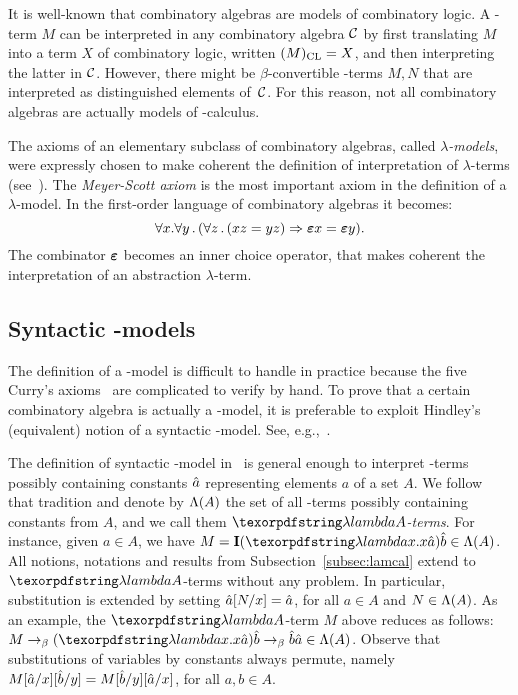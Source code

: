 It is well-known that combinatory algebras are models of combinatory logic. A \lam-term $M$ can be interpreted in any combinatory algebra $\cC$ by first translating $M$ into a term $X$ of combinatory logic, written $(M)_\CL = X$, and then interpreting the latter in $\cC$. However, there might be $\beta$-convertible \lam-terms $M,N$ that are interpreted as distinguished elements of~$\cC$. For this reason, not all combinatory algebras are actually models of \lam-calculus.

The axioms of an elementary subclass of combinatory algebras, called \emph{$\lambda$-models}, were expressly chosen to make coherent the definition of interpretation of $\lambda$-terms (see~\cite[Def.~5.2.1]{Bare}).
The \emph{Meyer-Scott axiom} is the most important axiom in the definition of a $\lambda$-model.
In the first-order language of combinatory algebras it becomes:
\[
\forall x. \forall y\,.\,(\forall z\,.\, (xz = yz) \Rightarrow \sso x = \sso y).
\]
The combinator $\sso$ becomes an inner choice operator, that makes coherent the interpretation of an abstraction $\lambda$-term.

\subsection{Syntactic \lam-models}

The definition of a \lam-model is difficult to handle in practice because the five Curry's axioms~\cite[Thm.~5.2.5]{Bare} are complicated to verify by hand.
To prove that a certain combinatory algebra is actually a \lam-model, it is preferable to exploit Hindley's (equivalent) notion of a syntactic \lam-model. See, e.g.,~\cite{Koymans82}.

The definition of syntactic \lam-model in~\cite{Koymans82} is general enough to interpret \lam-terms possibly containing constants $\cons{a}$ representing elements $a$ of a set $A$.
We follow that tradition and denote by $\Lam(A)$ the set of all \lam-terms possibly containing constants from $A$, and we call them \emph{$\lam A$-terms}. For instance, given $a\in A$, we have $M =\comb{I}(\lam x.x\cons a)\cons b\in\Lam(A)$.
All notions, notations and results from Subsection~\ref{subsec:lamcal} extend to $\lam A$-terms without any problem.
In particular, substitution is extended by setting $\cons a\subst{x}{N} = \cons a$, for all $a \in A$ and $N\in\Lam(A)$.
As an example, the $\lam A$-term $M$ above reduces as follows: $M \to_\beta (\lam x.x\cons a)\cons b\to_\beta \cons b\cons a\in\Lam(A)$.
Observe that substitutions of variables by constants always permute, namely $M\subst{x}{\cons a}\subst{y}{\cons b} = M\subst{y}{\cons b}\subst{x}{\cons a}$, for all $a,b\in A$.


